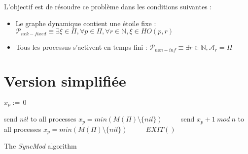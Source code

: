 \documentclass{article}
\begin{document}
L'objectif est de résoudre ce problème dans les conditions suivantes :
\begin{itemize}

	\item Le graphe dynamique contient une étoile fixe : $\mathcal{P}_{nek-fixed} \equiv \exists \xi \in \Pi, \forall p \in \Pi, \forall r \in \mathds{N}, \xi \in HO(p, r)$
	\item Tous les processus s'activent en temps fini : $\mathcal{P}_{non-inf} \equiv \exists r \in \mathds{N}, \mathcal{A}_r = \Pi$

\end{itemize}

\section{Version simplifiée}

\begin{algorithm}[htb]
\begin{distribalgo}[1]
\BLANK {}
  \STATE $x_p :=\, 0$ 

\ENDINDENT \BLANK

    \STATE send $nil$ to all processes
  \ENDINDENT
  \BLANK
	\STATE $x_p = min(M(\Pi) \setminus \{nil\})$ ~~~~
  \ENDINDENT
\ENDINDENT \BLANK
{}
    \STATE send $x_p+1~mod~n$ to all processes
  \ENDINDENT
  \BLANK
	\STATE $x_p = min(M(\Pi) \setminus \{nil\})$ ~~~~
	\STATE $EXIT()$ ~~~~
	\ENDIF
  \ENDINDENT
\ENDINDENT \BLANK


\caption{The {\em SyncMod} algorithm} \label{algo:R}
\end{distribalgo}

\end{algorithm}
\end{document}
